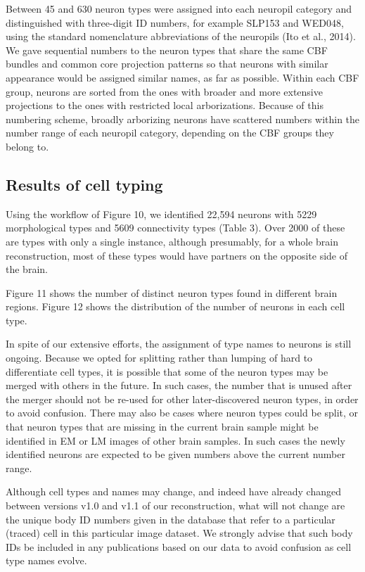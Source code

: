 \documentclass{article}
\begin{document}
Between 45 and 630 neuron types were assigned into each neuropil category and distinguished with three-digit ID numbers, for example SLP153 and WED048, using the standard nomenclature abbreviations of the neuropils (Ito et al., 2014). We gave sequential numbers to the neuron types that share the same CBF bundles and common core projection patterns so that neurons with similar appearance would be assigned similar names, as far as possible. Within each CBF group, neurons are sorted from the ones with broader and more extensive projections to the ones with restricted local arborizations. Because of this numbering scheme, broadly arborizing neurons have scattered numbers within the number range of each neuropil category, depending on the CBF groups they belong to.

\subsection*{Results of cell typing}

Using the workflow of Figure 10, we identified 22,594 neurons with 5229 morphological types and 5609 connectivity types (Table 3). Over 2000 of these are types with only a single instance, although presumably, for a whole brain reconstruction, most of these types would have partners on the opposite side of the brain.

Figure 11 shows the number of distinct neuron types found in different brain regions. Figure 12 shows the distribution of the number of neurons in each cell type.

In spite of our extensive efforts, the assignment of type names to neurons is still ongoing. Because we opted for splitting rather than lumping of hard to differentiate cell types, it is possible that some of the neuron types may be merged with others in the future. In such cases, the number that is unused after the merger should not be re-used for other later-discovered neuron types, in order to avoid confusion. There may also be cases where neuron types could be split, or that neuron types that are missing in the current brain sample might be identified in EM or LM images of other brain samples. In such cases the newly identified neurons are expected to be given numbers above the current number range.

Although cell types and names may change, and indeed have already changed between versions v1.0 and v1.1 of our reconstruction, what will not change are the unique body ID numbers given in the database that refer to a particular (traced) cell in this particular image dataset. We strongly advise that such body IDs be included in any publications based on our data to avoid confusion as cell type names evolve.
\end{document}
